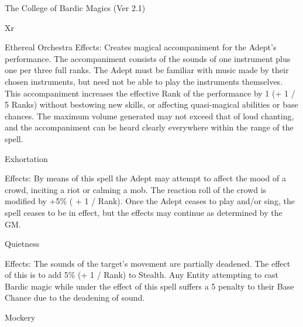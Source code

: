 \begin{Chapter}{The College of Bardic Magics (Ver 2.1)}
\begin{tarularx}{\columnwidth}{Xr}
\begin{spell}[G-3]{Ethereal Orchestra }
Effects:  Creates  magical  accompaniment  for  the 
Adept’s performance. The accompaniment consists 
of the sounds of one instrument plus one per three 
full ranks. The Adept must be familiar with music 
made by their chosen instruments, but need not be 
able  to  play  the  instruments  themselves.  This  accompaniment  increases  the  effective  Rank  of  the 
performance by 1 (+ 1 / 5 Ranks) without bestowing  new  skills,  or  affecting  quasi-magical  abilities 
or  base  chances.  The  maximum  volume  generated 
may  not  exceed  that  of  loud  chanting,  and  the 
accompaniment  can  be  heard  clearly  everywhere 
within the range of the spell. 
\end{spell}


\begin{spell}[G-4]{Exhortation }

Effects:  By  means  of  this  spell  the  Adept  may 
attempt  to  affect  the  mood  of  a  crowd,  inciting  a 
riot  or  calming  a  mob.  The  reaction  roll  of  the 
crowd is modified by +5\% ( + 1 / Rank). Once the 
Adept ceases to play and/or sing, the spell ceases to 
be in effect, but the effects may continue as determined by the GM. 
\end{spell}

\begin{spell}[G-5]{Quietness }

Effects:  The  sounds  of  the  target’s  movement  are 
partially deadened. The effect of this is to add 5\% 
(+  1  /  Rank)  to  Stealth.  Any  Entity  attempting  to 
cast  Bardic  magic  while  under  the  effect  of  this 
spell  suffers  a  5  penalty  to  their  Base  Chance  due 
to the deadening of sound. 
\end{spell}

\begin{spell}[G-6]{Mockery }


\end{spell}
\end{tarularx}
\end{Chapter}
